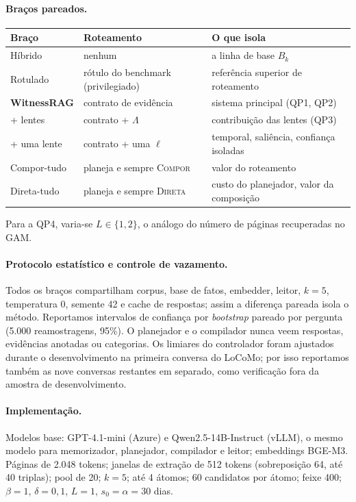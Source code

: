 \documentclass[11pt]{article}
\newcommand{\Compose}{\textsc{Compor}}
\newcommand{\Direct}{\textsc{Direta}}
\begin{document}
\paragraph{Braços pareados.}
\begin{center}
\small
\begin{tabular}{@{}lll@{}}
\toprule
Braço & Roteamento & O que isola \\
\midrule
Híbrido & nenhum & a linha de base $B_k$ \\
Rotulado & rótulo do benchmark (privilegiado) & referência superior de roteamento \\
\textbf{WitnessRAG} & contrato de evidência & sistema principal (QP1, QP2) \\
\quad + lentes & contrato + $\Lambda$ & contribuição das lentes (QP3) \\
\quad + uma lente & contrato + uma $\ell$ & temporal, saliência, confiança isoladas \\
Compor-tudo & planeja e sempre \Compose{} & valor do roteamento \\
Direta-tudo & planeja e sempre \Direct{} & custo do planejador, valor da composição \\
\bottomrule
\end{tabular}
\end{center}
Para a QP4, varia-se $L\in\{1,2\}$, o análogo do número de páginas
recuperadas no GAM.

\paragraph{Protocolo estatístico e controle de vazamento.}
Todos os braços compartilham corpus, base de fatos, embedder, leitor, $k=5$,
temperatura 0, semente 42 e cache de respostas; assim a diferença pareada
isola o método. Reportamos intervalos de confiança por \emph{bootstrap}
pareado por pergunta (5.000 reamostragens, 95\%). O planejador e o compilador
nunca veem respostas, evidências anotadas ou categorias. Os limiares do
controlador foram ajustados durante o desenvolvimento na primeira conversa do
LoCoMo; por isso reportamos também as nove conversas restantes em separado,
como verificação fora da amostra de desenvolvimento.

\paragraph{Implementação.}
Modelos base: GPT-4.1-mini (Azure) e Qwen2.5-14B-Instruct (vLLM), o mesmo
modelo para memorizador, planejador, compilador e leitor; embeddings BGE-M3.
Páginas de 2.048 tokens; janelas de extração de 512 tokens (sobreposição 64,
até 40 triplas); pool de 20; $k=5$; até 4 átomos; 60 candidatos por átomo;
feixe 400; $\beta=1$, $\delta=0{,}1$, $L=1$, $s_0=\alpha=30$ dias.
\end{document}
